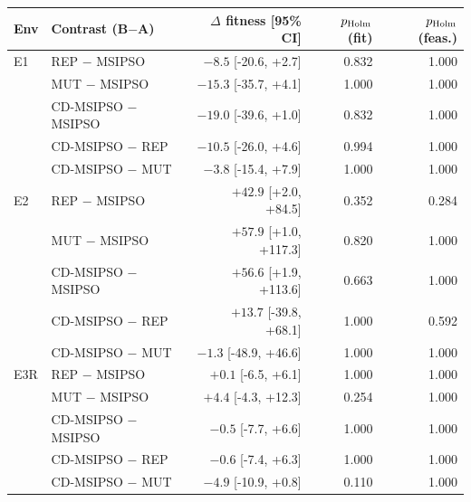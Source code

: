 \begin{tabular}{llrrr}
\hline
Env & Contrast (B$-$A) & $\Delta$ fitness [95\% CI] & $p_{\rm Holm}$ (fit) & $p_{\rm Holm}$ (feas.) \\
\hline
E1 & REP $-$ MSIPSO & $-8.5$ [-20.6, +2.7] & 0.832 & 1.000 \\
 & MUT $-$ MSIPSO & $-15.3$ [-35.7, +4.1] & 1.000 & 1.000 \\
 & CD-MSIPSO $-$ MSIPSO & $-19.0$ [-39.6, +1.0] & 0.832 & 1.000 \\
 & CD-MSIPSO $-$ REP & $-10.5$ [-26.0, +4.6] & 0.994 & 1.000 \\
 & CD-MSIPSO $-$ MUT & $-3.8$ [-15.4, +7.9] & 1.000 & 1.000 \\
\hline
E2 & REP $-$ MSIPSO & $+42.9$ [+2.0, +84.5] & 0.352 & 0.284 \\
 & MUT $-$ MSIPSO & $+57.9$ [+1.0, +117.3] & 0.820 & 1.000 \\
 & CD-MSIPSO $-$ MSIPSO & $+56.6$ [+1.9, +113.6] & 0.663 & 1.000 \\
 & CD-MSIPSO $-$ REP & $+13.7$ [-39.8, +68.1] & 1.000 & 0.592 \\
 & CD-MSIPSO $-$ MUT & $-1.3$ [-48.9, +46.6] & 1.000 & 1.000 \\
\hline
E3R & REP $-$ MSIPSO & $+0.1$ [-6.5, +6.1] & 1.000 & 1.000 \\
 & MUT $-$ MSIPSO & $+4.4$ [-4.3, +12.3] & 0.254 & 1.000 \\
 & CD-MSIPSO $-$ MSIPSO & $-0.5$ [-7.7, +6.6] & 1.000 & 1.000 \\
 & CD-MSIPSO $-$ REP & $-0.6$ [-7.4, +6.3] & 1.000 & 1.000 \\
 & CD-MSIPSO $-$ MUT & $-4.9$ [-10.9, +0.8] & 0.110 & 1.000 \\
\hline
\end{tabular}
